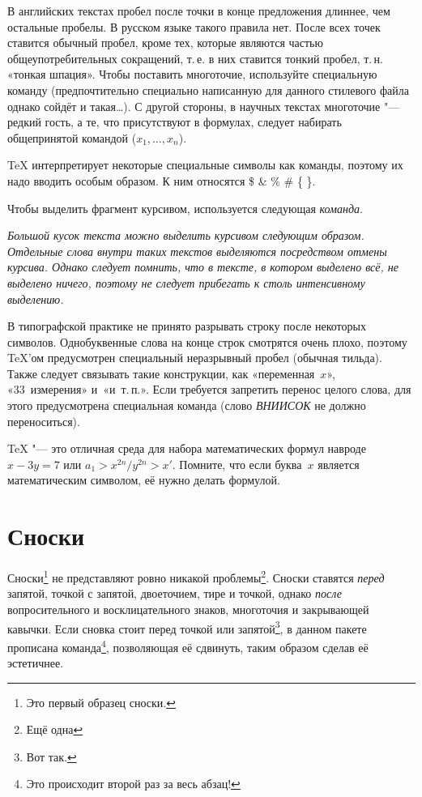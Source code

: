 \documentclass[final,pdftex]{epsilonj}
\numberwithin{equation}{section}
\begin{document}
В английских текстах пробел после точки в конце предложения длиннее, чем остальные пробелы. В русском языке такого правила нет. После всех точек ставится обычный пробел, кроме тех, которые являются частью общеупотребительных сокращений, т.\,е. в них ставится тонкий пробел, т.\,н. «тонкая шпация». Чтобы поставить многоточие, используйте специальную команду (предпочтительно специально написанную для данного стилевого файла\ldotst{} однако сойдёт и такая\ldots{}). С другой стороны, в научных текстах многоточие "--- редкий гость, а те, что присутствуют в формулах, следует набирать общепринятой командой ($x_1, \ldots, x_n$).

\TeX{} интерпретирует некоторые специальные символы  как команды, поэтому их надо вводить особым образом. К ним относятся 
       \$ \& \% \# \{ \}.

Чтобы выделить фрагмент курсивом, используется следующая \textit{команда}.


\emph{Большой кусок текста можно выделить курсивом следующим образом. Отдельные слова внутри таких текстов выделяются посредством \emph{отмены курсива}. Однако следует помнить, что в тексте, в котором выделено всё, не выделено ничего, поэтому не следует прибегать к столь интенсивному выделению.}

В типографской практике не принято разрывать строку после некоторых символов. Однобуквенные слова на конце строк смотрятся очень плохо, поэтому \TeX'ом предусмотрен специальный неразрывный пробел (обычная тильда). Также следует связывать такие конструкции, как «переменная~$x$», «33~измерения» и~«и~т.\,п.». Если требуется запретить перенос целого слова, для этого предусмотрена специальная команда (слово \mbox{\emph{ВНИИСОК}} не должно переноситься).

\TeX{} "--- это отличная среда для набора математических формул навроде 
       $ x-3y = 7 $
или
       $ a_{1} > x^{2n} / y^{2n} > x' $.
Помните, что если буква~$x$ является математическим символом, её нужно делать формулой.

\section{Сноски}
Сноски\footnote{Это первый образец сноски.}
не представляют ровно никакой проблемы\footnote{Ещё одна}\fnnsp. Сноски ставятся \emph{перед} запятой, точкой с запятой, двоеточием, тире и точкой, однако \emph{после} вопросительного и восклицательного знаков, многоточия и закрывающей кавычки. Если сновка стоит перед точкой или запятой\footnote{Вот так.}, в данном пакете прописана команда\footnote{Это происходит второй раз за весь абзац!}\fnnsp, позволяющая её сдвинуть, таким образом сделав её эстетичнее.
\end{document}
